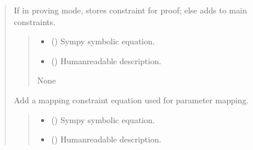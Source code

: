 \documentclass[letterpaper,10pt,english]{sphinxmanual}
\begin{document}
\begin{quote}
\begin{fulllineitems}
\begin{fulllineitems}
\sphinxAtStartPar
If in proving mode, stores constraint for proof; else adds to main constraints.
\begin{quote}\begin{description}
\begin{itemize}
\item {} 
\sphinxAtStartPar
{} () \textendash{} Sympy symbolic equation.

\item {} 
\sphinxAtStartPar
{} () \textendash{} Human\sphinxhyphen{}readable description.

\end{itemize}

\sphinxAtStartPar
None

\end{description}\end{quote}

\end{fulllineitems}


\begin{fulllineitems}
\label{\detokenize{pygeox:pygeox.geoscene.GeoScene.add_mapping_constraint}}
\pysigstartsignatures
\pysiglinewithargsret
{}
{\sphinxparamcomma {}}
{}
\pysigstopsignatures
\sphinxAtStartPar
Add a mapping constraint equation used for parameter mapping.
\begin{quote}\begin{description}
\begin{itemize}
\item {} 
\sphinxAtStartPar
{} () \textendash{} Sympy symbolic equation.

\item {} 
\sphinxAtStartPar
{} () \textendash{} Human\sphinxhyphen{}readable description.


\end{itemize}
\end{description}
\end{quote}
\end{fulllineitems}
\end{fulllineitems}
\end{quote}
\end{document}
